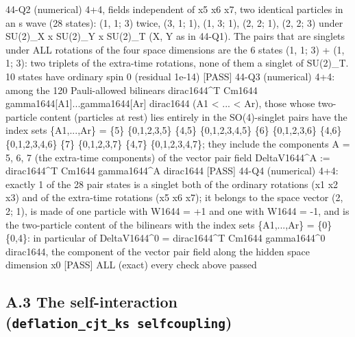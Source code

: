\documentclass[
  10pt,
]{article}
\newenvironment{Shaded}{}{}
\newcommand{\NormalTok}[1]{#1}
\begin{document}
\begin{Shaded}
\begin{Highlighting}[]
\NormalTok{[PASS] 44{-}Q2  (numerical) 4+4, fields independent of x5 x6 x7, two identical particles in an s wave (28 states): (1, 1; 3) twice, (3, 1; 1), (1, 3; 1), (2, 2; 1), (2, 2; 3) under SU(2)\_X x SU(2)\_Y x SU(2)\_T (X, Y as in 44{-}Q1).  The pairs that are singlets under ALL rotations of the four space dimensions are the 6 states (1, 1; 3) + (1, 1; 3): two triplets of the extra{-}time rotations, none of them a singlet of SU(2)\_T.  10 states have ordinary spin 0 (residual 1e{-}14)}
\NormalTok{[PASS] 44{-}Q3  (numerical) 4+4: among the 120 Pauli{-}allowed bilinears dirac1644\^{}T Cm1644 gamma1644[A1]...gamma1644[Ar] dirac1644 (A1 \textless{} ... \textless{} Ar), those whose two{-}particle content (particles at rest) lies entirely in the SO(4){-}singlet pairs have the index sets \{A1,...,Ar\} = \{5\} \{0,1,2,3,5\} \{4,5\} \{0,1,2,3,4,5\} \{6\} \{0,1,2,3,6\} \{4,6\} \{0,1,2,3,4,6\} \{7\} \{0,1,2,3,7\} \{4,7\} \{0,1,2,3,4,7\}; they include the components A = 5, 6, 7 (the extra{-}time components) of the vector pair field DeltaV1644\^{}A := dirac1644\^{}T Cm1644 gamma1644\^{}A dirac1644}
\NormalTok{[PASS] 44{-}Q4  (numerical) 4+4: exactly 1 of the 28 pair states is a singlet both of the ordinary rotations (x1 x2 x3) and of the extra{-}time rotations (x5 x6 x7); it belongs to the space vector (2, 2; 1), is made of one particle with W1644 = +1 and one with W1644 = {-}1, and is the two{-}particle content of the bilinears with the index sets \{A1,...,Ar\} = \{0\} \{0,4\}: in particular of DeltaV1644\^{}0 = dirac1644\^{}T Cm1644 gamma1644\^{}0 dirac1644, the component of the vector pair field along the hidden space dimension x0}
\NormalTok{[PASS] ALL  (exact) every check above passed}
\end{Highlighting}
\end{Shaded}

\hypertarget{a.3-the-self-interaction-deflation_cjt_ks-selfcoupling}{%
\subsection{\texorpdfstring{A.3 The self-interaction
(\texttt{deflation\_cjt\_ks\ selfcoupling})}{A.3 The self-interaction (deflation\_cjt\_ks selfcoupling)}}\label{a.3-the-self-interaction-deflation_cjt_ks-selfcoupling}}
\end{document}
